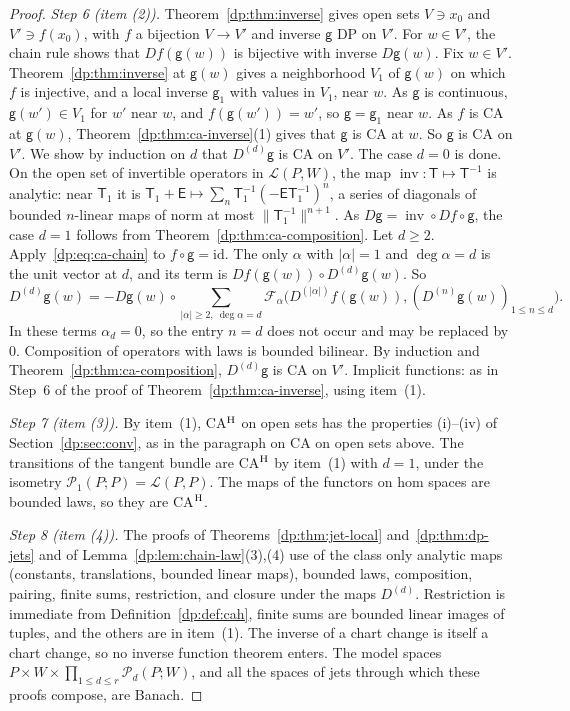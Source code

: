 \documentclass[11pt]{amsart}
\theoremstyle{definition}
\theoremstyle{remark}
\numberwithin{equation}{section}
\newcommand{\cL}{\mathcal L}
\newcommand{\id}{\mathrm{id}}
\newcommand{\abs}[1]{\lvert #1\rvert}
\newcommand{\norm}[1]{\lVert #1\rVert}
\theoremstyle{plain}
\theoremstyle{definition}
\theoremstyle{plain}
\newcommand{\cP}{\mathcal P}
\begin{document}
\begin{proof}
\emph{Step 6 (item (2)).} Theorem~\ref{dp:thm:inverse} gives open sets $V\ni x_0$ and $V'\ni f(x_0)$, with $f$ a bijection $V\to V'$ and inverse $\mathsf g$ DP on $V'$. For $w\in V'$, the chain rule shows that $Df(\mathsf g(w))$ is bijective with inverse $D\mathsf g(w)$. Fix $w\in V'$. Theorem~\ref{dp:thm:inverse} at $\mathsf g(w)$ gives a neighborhood $V_1$ of $\mathsf g(w)$ on which $f$ is injective, and a local inverse $\mathsf g_1$ with values in $V_1$, near $w$. As $\mathsf g$ is continuous, $\mathsf g(w')\in V_1$ for $w'$ near $w$, and $f(\mathsf g(w'))=w'$, so $\mathsf g=\mathsf g_1$ near $w$. As $f$ is CA at $\mathsf g(w)$, Theorem~\ref{dp:thm:ca-inverse}(1) gives that $\mathsf g$ is CA at $w$. So $\mathsf g$ is CA on $V'$. We show by induction on $d$ that $D^{(d)}\mathsf g$ is CA on $V'$. The case $d=0$ is done. On the open set of invertible operators in $\cL(P,W)$, the map $\operatorname{inv}\colon\mathsf T\mapsto\mathsf T^{-1}$ is analytic: near $\mathsf T_1$ it is $\mathsf T_1+\mathsf E\mapsto\sum_n\mathsf T_1^{-1}(-\mathsf E\mathsf T_1^{-1})^n$, a series of diagonals of bounded $n$-linear maps of norm at most $\norm{\mathsf T_1^{-1}}^{n+1}$. As $D\mathsf g=\operatorname{inv}\circ Df\circ\mathsf g$, the case $d=1$ follows from Theorem~\ref{dp:thm:ca-composition}. Let $d\ge2$. Apply~\eqref{dp:eq:ca-chain} to $f\circ\mathsf g=\id$. The only $\alpha$ with $\abs\alpha=1$ and $\deg\alpha=d$ is the unit vector at $d$, and its term is $Df(\mathsf g(w))\circ D^{(d)}\mathsf g(w)$. So
\[
 D^{(d)}\mathsf g(w)=-D\mathsf g(w)\circ\sum_{\abs\alpha\ge2,\ \deg\alpha=d}\mathcal F_\alpha\bigl(D^{(\abs\alpha)}f(\mathsf g(w)),(D^{(n)}\mathsf g(w))_{1\le n\le d}\bigr).
\]
In these terms $\alpha_d=0$, so the entry $n=d$ does not occur and may be replaced by $0$. Composition of operators with laws is bounded bilinear. By induction and Theorem~\ref{dp:thm:ca-composition}, $D^{(d)}\mathsf g$ is CA on $V'$. Implicit functions: as in Step~6 of the proof of Theorem~\ref{dp:thm:ca-inverse}, using item~(1).

\emph{Step 7 (item (3)).} By item~(1), CA$^{\rm H}$ on open sets has the properties (i)--(iv) of Section~\ref{dp:sec:conv}, as in the paragraph on CA on open sets above. The transitions of the tangent bundle are CA$^{\rm H}$ by item~(1) with $d=1$, under the isometry $\cP_1(P;P)=\cL(P,P)$. The maps of the functors on hom spaces are bounded laws, so they are CA$^{\rm H}$.

\emph{Step 8 (item (4)).} The proofs of Theorems~\ref{dp:thm:jet-local} and~\ref{dp:thm:dp-jets} and of Lemma~\ref{dp:lem:chain-law}(3),(4) use of the class only analytic maps (constants, translations, bounded linear maps), bounded laws, composition, pairing, finite sums, restriction, and closure under the maps $D^{(d)}$. Restriction is immediate from Definition~\ref{dp:def:cah}, finite sums are bounded linear images of tuples, and the others are in item~(1). The inverse of a chart change is itself a chart change, so no inverse function theorem enters. The model spaces $P\times W\times\prod_{1\le d\le r}\cP_d(P;W)$, and all the spaces of jets through which these proofs compose, are Banach.


\end{proof}
\end{document}
